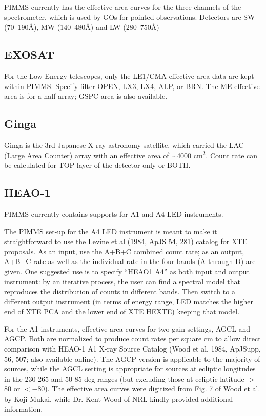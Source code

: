 \documentclass[11pt]{article}
\begin{document}
PIMMS currently has the effective area curves for the three channels of  the
spectrometer, which is used by GOs for pointed observations.  Detectors
are SW (70--190\AA), MW (140--480\AA) and LW (280--750\AA)

\subsection{EXOSAT}

For the Low Energy telescopes, only the LE1/CMA effective area data
are kept within PIMMS. Specify filter OPEN, LX3, LX4, ALP, or BRN.
The ME effective area is for a half-array; GSPC area is also available.

\subsection{Ginga}

Ginga is the 3rd Japanese X-ray astronomy satellite, which carried the LAC
(Large Area Counter) array with an effective area of $\sim$4000 cm$^2$.
Count rate can be calculated for TOP layer of the detector only or BOTH.

\subsection{HEAO-1}

PIMMS currently contains supports for A1 and A4 LED instruments.

The PIMMS set-up for the A4 LED instrument is meant to make it straightforward
to use the Levine et al (1984, ApJS 54, 281) catalog for XTE proposals.  As an
input, use the A+B+C combined count rate; as an output, A+B+C rate as well
as the individual rate in the four bands (A through D) are given.  One
suggested use is to specify ``HEAO1 A4'' as both input and output instrument:
by an iterative process, the user can find a spectral model that reproduces
the distribution of counts in different bands.  Then switch to a different
output instrument (in terms of energy range, LED matches the higher end of
XTE PCA and the lower end of XTE HEXTE) keeping that model.

For the A1 instruments, effective area curves for two gain settings, AGCL
and AGCP. Both are normalized to produce count rates per square cm to allow
direct comparison with HEAO-1 A1 X-ray Source Catalog (Wood et al. 1984,
ApJSupp, 56, 507; also available online). The AGCP version is applicable to
the majority of sources, while the AGCL setting is appropriate for sources at
ecliptic longitudes in the 230-265 and 50-85 deg ranges (but excluding those
at ecliptic latitude $>+$80 or $<-$80). The effective area curves were
digitized from Fig. 7 of Wood et al. by Koji Mukai, while Dr. Kent Wood of
NRL kindly provided additional information.
\end{document}
